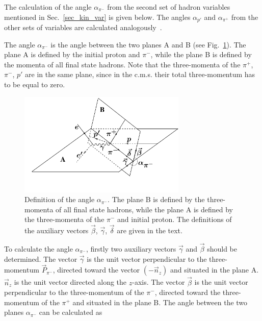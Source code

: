 \documentclass[prc,twocolumn,superscriptaddress,showpacs,amssymb,amsmath,amsfonts,aps,nofootinbib]{revtex4-1}
\begin{document}
The calculation of the angle $\alpha_{\pi^{-}}$ from the second set of hadron variables mentioned in Sec.~\ref{sec_kin_var} is given below. The angles $\alpha_{p'}$ and $\alpha_{\pi^{+}}$ from the other sets of variables are calculated analogously~\cite{Fed_an_note:2017}.

The angle $\alpha_{\pi^{-}}$ is the angle between the two planes A and B (see Fig.~\ref{fig:cr_sec_kinematic2}).
The plane A is defined by
the initial proton and $\pi^{-}$, while the plane B is defined by the momenta of
all final state hadrons. Note that the three-momenta of the $\pi^{+}$,
$\pi^{-}$, $p'$ are in the same plane, since in the c.m.s.
their total three-momentum has to be equal to zero.


\begin{figure}[htp]
\begin{center}
\includegraphics[width=8cm,trim=0mm 14mm 0mm 0mm,clip]{pictures/angles/alpha_pim_draw.pdf}
\caption{\small Definition of the angle $\alpha_{\pi^{-}}$. The plane B is defined by the three-momenta of all final state hadrons, while the plane A is defined by  the three-momenta of the $\pi^{-}$ and initial proton. The definitions of the auxiliary vectors $\vec \beta$, $\vec \gamma$, $\vec \delta$ are given in the text.} \label{fig:cr_sec_kinematic2}
\end{center}
\end{figure}


To calculate the angle $\alpha_{\pi^{-}}$, firstly two
auxiliary vectors $\vec \gamma$  and
$\vec \beta$ should be determined. The vector $\vec \gamma$ is the unit vector perpendicular to the three-momentum
$\vec P_{\pi^{-}}$, directed toward the vector $(-\vec n_{z})$ and situated in the plane A. $\vec
n_{z}$ is the unit vector directed along the $z$-axis.
The vector $\vec \beta$ is the unit vector perpendicular to the three-momentum of the $\pi^{-}$, 
directed toward the three-momentum of the $\pi^{+}$ and situated in the plane B. 
The angle between the two planes  $\alpha_{\pi^{-}}$ can be calculated as
 
\end{document}
